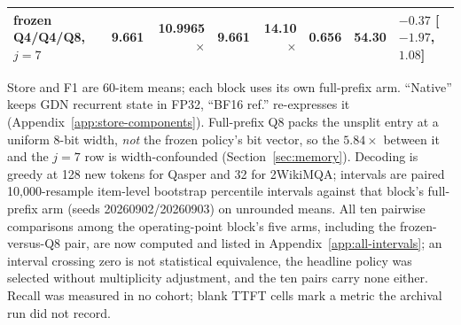 \begin{table}[t]
\begin{tabular}{@{}lrrrrrrl@{}}
\qcomem{} frozen Q4/Q4/Q8, $j=7$ & 9.661 & 10.9965$\times$ & 9.661 & 14.10$\times$ & 0.656 & 54.30 & $-0.37$ [$-1.97$, $1.08$] \\
\bottomrule
\end{tabular}
\vspace{0.5mm}
\parbox{0.97\textwidth}{\scriptsize Store and F1 are 60-item means; each block uses its own full-prefix arm.
``Native'' keeps GDN recurrent state in FP32, ``BF16 ref.'' re-expresses it
(Appendix~\ref{app:store-components}).  Full-prefix Q8 packs the
unsplit entry at a uniform 8-bit width, \emph{not} the frozen policy's bit
vector, so the $5.84\times$ between it and the $j=7$ row is width-confounded
(Section~\ref{sec:memory}).  Decoding is
greedy at 128 new tokens for Qasper and 32 for 2WikiMQA; intervals are paired
10,000-resample item-level bootstrap percentile intervals against that block's
full-prefix arm (seeds 20260902/20260903) on unrounded means.  All ten pairwise
comparisons among the operating-point block's five arms, including the
frozen-versus-Q8 pair, are now computed and listed in
Appendix~\ref{app:all-intervals}; an interval crossing zero is not statistical
equivalence, the headline policy was selected without multiplicity adjustment,
and the ten pairs carry none either.  Recall was measured in no
cohort; blank TTFT cells mark a metric the archival run did not record.}
\end{table}
